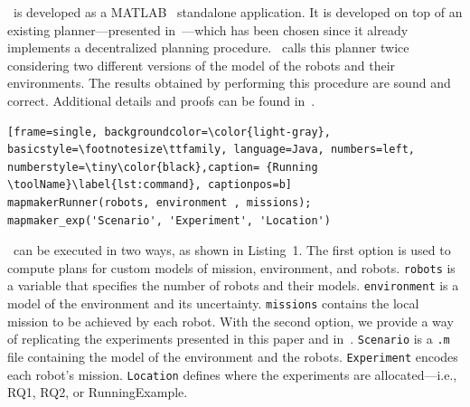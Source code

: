 
\toolName\ is developed as a  MATLAB~\cite{matlab} standalone application.
It is developed on top of an existing planner---presented in~\cite{tumova2016multi}---which has been chosen since it already implements a decentralized planning procedure.
\toolName\ calls this planner twice considering two different versions of the model of the robots and their environments. 
The results obtained by performing this procedure are sound and correct.
Additional details and proofs can be found in~\cite{menghi2018multi}.

\begin{lstlisting}[frame=single, backgroundcolor=\color{light-gray}, basicstyle=\footnotesize\ttfamily, language=Java, numbers=left, numberstyle=\tiny\color{black},caption= {Running \toolName}\label{lst:command}, captionpos=b]
mapmakerRunner(robots, environment , missions);
mapmaker_exp('Scenario', 'Experiment', 'Location')
\end{lstlisting}

\toolName\ can be executed in two ways, as shown in Listing~1. %
The first option is used to compute plans for custom models of mission, environment, and robots.
\texttt{robots} is a variable that specifies the number of robots and their models.
\texttt{environment} is a model of the environment and its uncertainty.
\texttt{missions} contains the local mission to be achieved by each robot.
With the second option, we provide a way of replicating the experiments presented in this paper and in~\cite{menghi2018multi}.
\texttt{Scenario} is a \texttt{.m} file containing the model of the environment and the robots.
\texttt{Experiment} encodes each robot's mission.
\texttt{Location} defines where the experiments are allocated---i.e., RQ1, RQ2, or RunningExample.








